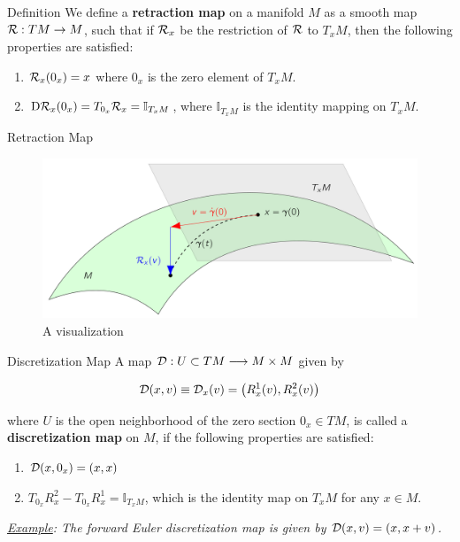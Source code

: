 \documentclass{beamer}
\begin{document}
\begin{frame}{Definition}
  We define a \textbf{retraction map} on a manifold $M$ as a smooth map $\mathcal{R}: TM \to M$, such that if $\mathcal{R}_x$ be the restriction of $\mathcal{R}$ to $T_x M$, then the following properties are satisfied:

    \begin{enumerate}
        \item $\mathcal{R}_x (0_x) = x$ where $0_x$ is the zero element of $T_x M$.
        \item $\text{D}\mathcal{R}_x (0_x ) = T_{0_x} \mathcal{R}_x = \mathbb{I}_{T_x M} $, where $\mathbb{I}_{T_x M}$ is the identity mapping on $T_x M$.
    \end{enumerate}
  
\end{frame}

\begin{frame}{Retraction Map}
\begin{figure}
  \centering
  \includegraphics[width=\textwidth]{../Figures/retraction.png}
  \caption{A visualization}
\end{figure}
\end{frame}

\begin{frame}{Discretization Map}
  A map $\mathcal{D} : U \subset TM \longrightarrow M \times M$ given by 

\[
  \mathcal{D} (x,v) \equiv \mathcal{D}_x(v) = \left( R^1_x(v), R^2_x(v) \right)
\]

where $U$ is the open neighborhood of the zero section $0_x \in TM$, is called a \textbf{discretization map} on $M$, if the following properties are satisfied:

\begin{enumerate}
  \item $\mathcal{D}(x,0_x) = (x,x)$ 
  \item $T_{0_x}R_x^2 - T_{0_x}R_x^1 = \mathbb{I}_{T_x M}$, which is the identity map on $T_x M$ for any $x \in M$.
\end{enumerate}
\pause[]

\textsl{\underline{Example}: The forward Euler discretization map is given by $\mathcal{D}(x,v) = (x, x + v)$.}
  
\end{frame}
\end{document}
